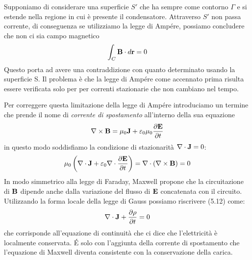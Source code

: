 Supponiamo di considerare una superficie $S'$ che ha sempre come contorno $\Gamma$ e si estende nella regione in cui \`e presente il condensatore. Attraverso $S'$ non passa corrente, di conseguenza se utilizziamo la legge di Amp\'ere, possiamo concludere che non ci sia campo magnetico
\begin{equation*}
	\int_{C} \bold{B} \cdot d\bold{r} = 0 
\end{equation*}
Questo porta ad avere una contraddizione con quanto determinato usando la superficie S. Il problema \`e che la legge di Amp\'ere come accennato prima risulta essere verificata solo per per correnti stazionarie che non cambiano nel tempo.
\newline

Per correggere questa limitazione della legge di Amp\'ere introduciamo un termine che prende il nome di \textit{corrente di spostamento} all'interno della sua equazione
\begin{equation}
	\nabla \times \bold{B} = \mu_0 \bold{J} + \varepsilon_0 \mu_0 \frac{\partial \bold{E}}{\partial t} 
\end{equation}
in questo modo soddisfiamo la condizione di stazionarit\`a $\nabla \cdot \bold{J} = 0$:
\begin{equation*}
	\mu_0 \left(\nabla \cdot \bold{J} + \varepsilon_0 \nabla \cdot \frac{\partial \bold{E}}{\partial t} \right)  = \nabla \cdot (\nabla \times \bold{B}) = 0
\end{equation*}
In modo simmetrico alla legge di Faraday, Maxwell propone che la circuitazione di $\bold{B}$ dipende anche dalla variazione del flusso di $\bold{E}$ concatenata con il circuito. Utilizzando la forma locale della legge di Gauss possiamo riscrivere (5.12) come:
\begin{equation}
	\nabla \cdot \bold{J} + \frac{\partial \rho}{\partial t} = 0
\end{equation}
che corrisponde all'equazione di continuit\`a che ci dice che l'elettricit\`a \`e localmente conservata. \'E solo con l'aggiunta della corrente di spostamento che l'equazione di Maxwell diventa consistente con la conservazione della carica.

